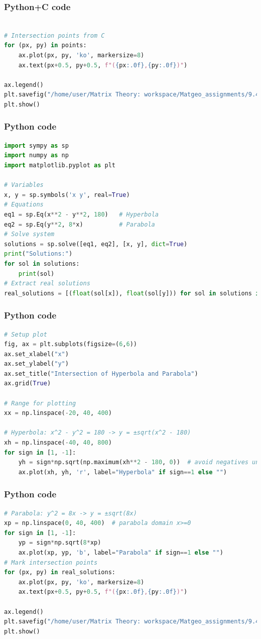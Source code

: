 \documentclass{beamer}
\begin{document}
\begin{frame}[fragile]
    \frametitle{Python+C code}

    \begin{lstlisting}[language=Python]
   
# Intersection points from C
for (px, py) in points:
    ax.plot(px, py, 'ko', markersize=8)
    ax.text(px+0.5, py+0.5, f"({px:.0f},{py:.0f})")

ax.legend()
plt.savefig("/home/user/Matrix Theory: workspace/Matgeo_assignments/9.4.39/figs/Figure_1.png")
plt.show()

    \end{lstlisting}
\end{frame}

\begin{frame}[fragile]
    \frametitle{Python code}
    \begin{lstlisting}[language=Python]
import sympy as sp
import numpy as np
import matplotlib.pyplot as plt

# Variables
x, y = sp.symbols('x y', real=True)
# Equations
eq1 = sp.Eq(x**2 - y**2, 180)   # Hyperbola
eq2 = sp.Eq(y**2, 8*x)          # Parabola
# Solve system
solutions = sp.solve([eq1, eq2], [x, y], dict=True)
print("Solutions:")
for sol in solutions:
    print(sol)
# Extract real solutions
real_solutions = [(float(sol[x]), float(sol[y])) for sol in solutions if sol[y].is_real]
    \end{lstlisting}   
\end{frame}

\begin{frame}[fragile]
    \frametitle{Python code}
    \begin{lstlisting}[language=Python]
# Setup plot
fig, ax = plt.subplots(figsize=(6,6))
ax.set_xlabel("x")
ax.set_ylabel("y")
ax.set_title("Intersection of Hyperbola and Parabola")
ax.grid(True)

# Range for plotting
xx = np.linspace(-20, 40, 400)

# Hyperbola: x^2 - y^2 = 180 -> y = ±sqrt(x^2 - 180)
xh = np.linspace(-40, 40, 800)
for sign in [1, -1]:
    yh = sign*np.sqrt(np.maximum(xh**2 - 180, 0))  # avoid negatives under sqrt
    ax.plot(xh, yh, 'r', label="Hyperbola" if sign==1 else "")
    \end{lstlisting}   
\end{frame}

\begin{frame}[fragile]
    \frametitle{Python code}
    \begin{lstlisting}[language=Python]
# Parabola: y^2 = 8x -> y = ±sqrt(8x)
xp = np.linspace(0, 40, 400)  # parabola domain x>=0
for sign in [1, -1]:
    yp = sign*np.sqrt(8*xp)
    ax.plot(xp, yp, 'b', label="Parabola" if sign==1 else "")
# Mark intersection points
for (px, py) in real_solutions:
    ax.plot(px, py, 'ko', markersize=8)
    ax.text(px+0.5, py+0.5, f"({px:.0f},{py:.0f})")

ax.legend()
plt.savefig("/home/user/Matrix Theory: workspace/Matgeo_assignments/9.4.39/figs/Figure_1.png")
plt.show()
    \end{lstlisting}   
\end{frame}
\end{document}
